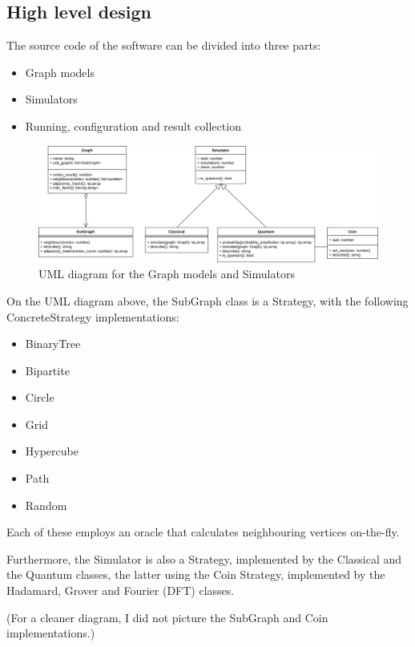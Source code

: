 \subsection{High level design}

The source code of the software can be divided into three parts:

\begin{itemize}
    \item Graph models
    \item Simulators
    \item Running, configuration and result collection
\end{itemize}

\begin{figure}[H]
  \includegraphics[width=\linewidth]{./figures/program/uml.png}
  \caption{UML diagram for the Graph models and Simulators}
\end{figure}

On the UML diagram above, the SubGraph class is a Strategy, with the following ConcreteStrategy implementations:

\begin{itemize}
    \item BinaryTree
    \item Bipartite
    \item Circle
    \item Grid
    \item Hypercube
    \item Path
    \item Random
\end{itemize}

Each of these employs an oracle that calculates neighbouring vertices on-the-fly.

Furthermore, the Simulator is also a Strategy, implemented by the Classical and the Quantum classes, the latter using the Coin Strategy, implemented by the Hadamard, Grover and Fourier (DFT) classes.

(For a cleaner diagram, I did not picture the SubGraph and Coin implementations.)

